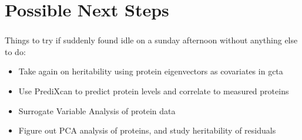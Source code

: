 \documentclass{beamer}
\begin{document}
  \section{Possible Next Steps}
  \begin{frame}
    \frametitle{}
    Things to try if suddenly found idle on a sunday afternoon without anything else to do:
    \begin{itemize}
      \item
      Take again on heritability using protein eigenvectors as covariates in gcta
      \item
      Use PrediXcan to predict protein levels and correlate to measured proteins
      \item
      Surrogate Variable Analysis of protein data
      \item
      Figure out PCA analysis of proteins, and study heritability of residuals
    \end{itemize}
  \end{frame}
\end{document}
